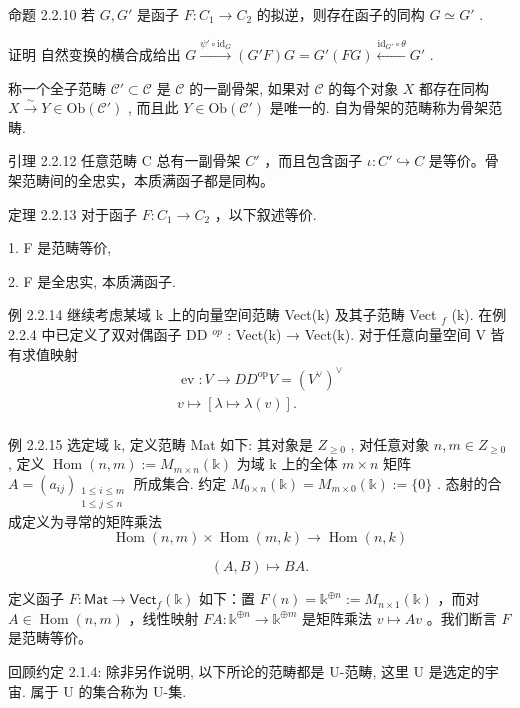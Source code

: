 \documentclass[]{article}
\begin{document}
命题 2.2.10 若 $G, G'$ 是函子 $F: C_{1} \rightarrow C_{2}$ 的拟逆，则存在函子的同构 $G \simeq G'$ . 

证明 自然变换的横合成给出 $G \xrightarrow{\psi' \circ \mathrm{id}_G} (G'F) G = G'(FG) \xleftarrow{\mathrm{id}_{G'} \circ \theta} G'$ . 

称一个全子范畴 $\mathcal{C}' \subset \mathcal{C}$ 是 $\mathcal{C}$ 的一副骨架, 如果对 $\mathcal{C}$ 的每个对象 $X$ 都存在同构 $X \xrightarrow{\sim} Y \in \mathrm{Ob}(\mathcal{C}')$ , 而且此 $Y \in \mathrm{Ob}(\mathcal{C}')$ 是唯一的. 自为骨架的范畴称为骨架范畴. 

引理 2.2.12 任意范畴 C 总有一副骨架 $C'$ ，而且包含函子 $\iota: C' \hookrightarrow C$ 是等价。骨架范畴间的全忠实，本质满函子都是同构。 

定理 2.2.13 对于函子 $F: C_{1} \rightarrow C_{2}$ ，以下叙述等价. 

1. F 是范畴等价, 

2. F 是全忠实, 本质满函子. 

例 2.2.14 继续考虑某域 k 上的向量空间范畴 Vect(k) 及其子范畴 Vect $_{f}$ (k). 在例 2.2.4 中已定义了双对偶函子 DD $^{op}$ : Vect(k) → Vect(k). 对于任意向量空间 V 皆有求值映射 $$
\begin{array}{l} \operatorname{ev}: V \longrightarrow D D ^ {\mathrm{op}} V = (V ^ {\vee}) ^ {\vee} \\ v \longmapsto [ \lambda \mapsto \lambda (v) ]. \\ \end{array}
$$

例 2.2.15 选定域 k, 定义范畴 Mat 如下: 其对象是 $Z_{\geq0}$ , 对任意对象 $n, m \in Z_{\geq0}$ , 定义 $\operatorname{Hom}(n, m) := M_{m \times n}(\mathbb{k})$ 为域 k 上的全体 $m \times n$ 矩阵 $A = (a_{ij})_{\substack{1 \leq i \leq m \\ 1 \leq j \leq n}}$ 所成集合. 约定 $M_{0 \times n}(\mathbb{k}) = M_{m \times 0}(\mathbb{k}) := \{0\}$ . 态射的合成定义为寻常的矩阵乘法 $$
\operatorname{Hom} (n, m) \times \operatorname{Hom} (m, k) \longrightarrow \operatorname{Hom} (n, k)
$$

$$
(A, B) \longmapsto B A.
$$

定义函子 $F: \mathsf{Mat} \to \mathsf{Vect}_f(\mathbb{k})$ 如下：置 $F(n) = \mathbb{k}^{\oplus n} := M_{n \times 1}(\mathbb{k})$ ，而对 $A \in \operatorname{Hom}(n, m)$ ，线性映射 $FA: \mathbb{k}^{\oplus n} \to \mathbb{k}^{\oplus m}$ 是矩阵乘法 $v \mapsto Av$ 。我们断言 $F$ 是范畴等价。 


回顾约定 2.1.4: 除非另作说明, 以下所论的范畴都是 U-范畴, 这里 U 是选定的宇宙. 属于 U 的集合称为 U-集. 
\end{document}
